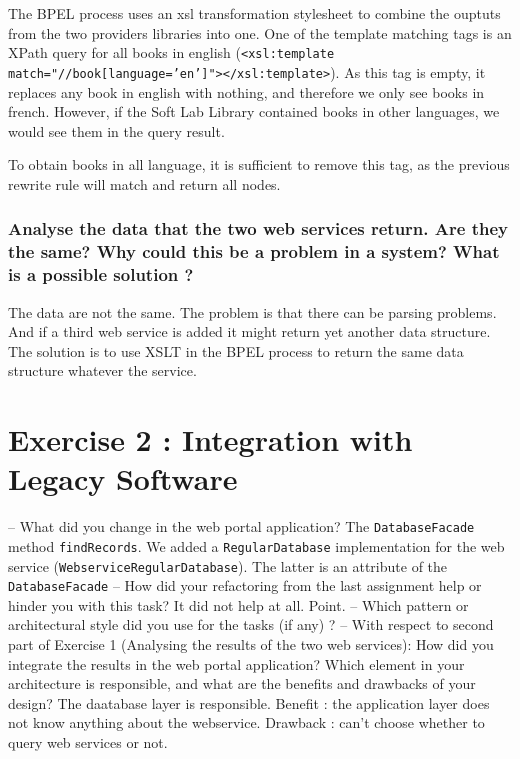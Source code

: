 The BPEL process uses an xsl transformation stylesheet to combine the ouptuts from the two providers libraries into one. One of the template matching tags is an XPath query for all books in english (\texttt{<xsl:template match="//book[language='en']"></xsl:template>}). As this tag is empty, it replaces any book in english with nothing, and therefore we only see books in french. However, if the Soft Lab Library contained books in other languages, we would see them in the query result.

To obtain books in all language, it is sufficient to remove this tag, as the previous rewrite rule will match and return all nodes.

\subsubsection{Analyse the data that the two web services return. Are they the same? Why
could this be a problem in a system? What is a possible solution ?}

The data are not the same. The problem is that there can be parsing problems. And if a third web service is added it might return yet another data structure. The solution is to use XSLT in the BPEL process to return the same data structure whatever the service.

\section{Exercise 2 : Integration with Legacy Software}

    – What did you change in the web portal application?
    The \texttt{DatabaseFacade} method \texttt{findRecords}. We added a \texttt{RegularDatabase} implementation for the web service (\texttt{WebserviceRegularDatabase}). The latter is an attribute of the \texttt{DatabaseFacade}
    – How did your refactoring from the last assignment help or hinder you with
    this task?
    It did not help at all. Point.
    – Which pattern or architectural style did you use for the tasks (if any) ?
    – With respect to second part of Exercise 1 (Analysing the results of the two
    web services): How did you integrate the results in the web portal application?
    Which element in your architecture is responsible, and what are the benefits
    and drawbacks of your design?
    The daatabase layer is responsible. Benefit : the application layer does not know anything about the webservice. Drawback : can't choose whether to query web services or not.


